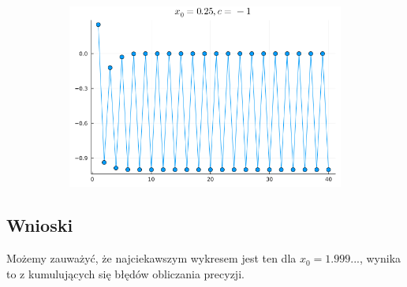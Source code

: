 \documentclass{article}
\def\v{0.47}
\begin{document}
\begin{figure}[H]
\begin{subfigure}[b]{\v\linewidth}
		\end{subfigure}
		\begin{subfigure}[b]{\v\linewidth}
			\includegraphics[width=\linewidth]{graphs/7.png}
		\end{subfigure}
	\end{figure}
\subsection*{Wnioski}
	Możemy zauważyć, że najciekawszym wykresem jest ten dla $x_0 = 1.999...$, wynika to z kumulujących się błędów obliczania precyzji.
\end{document}
